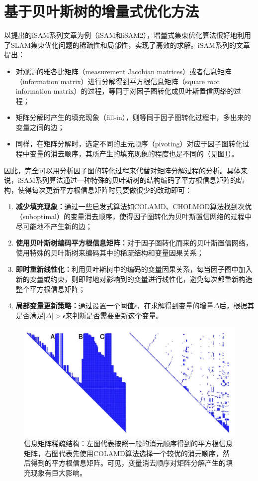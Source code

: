 \section{基于贝叶斯树的增量式优化方法}

以\citeauthor{kaess2008isam}提出的iSAM系列文章为例（iSAM\citep{kaess2008isam}和iSAM2\citep{kaess2012isam2}），增量式集束优化算法很好地利用了SLAM集束优化问题的稀疏性和局部性，实现了高效的求解。iSAM系列的文章提出：
\begin{itemize}
    \item 对观测的雅各比矩阵（measurement Jacobian matrices）或者信息矩阵（information matrix）进行分解得到平方根信息矩阵（square root information matrix）的过程，等同于对因子图转化成贝叶斯置信网络的过程；
    \item 矩阵分解时产生的填充现象（fill-in），则等同于因子图转化过程中，多出来的变量之间的边；
    \item 同样，在矩阵分解时，选定不同的主元顺序（pivoting）对应于因子图转化过程中变量的消去顺序，其所产生的填充现象的程度也是不同的（见图\ref{fig:fill_in}）。
\end{itemize}

因此，完全可以用分析因子图的转化过程来代替对矩阵分解过程的分析。具体来说，iSAM系列算法通过一种特殊的贝叶斯树的结构编码了平方根信息矩阵的结构，使得每次更新平方根信息矩阵时只要做很少的改动即可：
\begin{enumerate}
    \item \textbf{减少填充现象：}通过一些启发式算法如COLAMD\citep{davis2004algorithm}、CHOLMOD\citep{chen2008algorithm}算法找到次优（suboptimal）的变量消去顺序，使得因子图转化为贝叶斯置信网络的过程中尽可能地不产生新的边；
    \item \textbf{使用贝叶斯树编码平方根信息矩阵：}对于因子图转化而来的贝叶斯置信网络，使用特殊的贝叶斯树来编码其中的稀疏结构和变量因果关系；
    \item \textbf{即时重新线性化：}利用贝叶斯树中的编码的变量因果关系，每当因子图中加入新的变量或约束，则即时地对影响到的变量进行线性化，避免每次都重新构造整个平方根信息矩阵；
    \item \textbf{局部变量更新策略：}通过设置一个阈值$\epsilon$，在求解得到变量的增量$\Delta$后，根据其是否满足$|\Delta|>\epsilon$来判断是否需要更新这个变量。
\end{enumerate}

\begin{figure}[htbp]
    \centering
    \includegraphics[width=.8\textwidth]{./figs/sparse_pattern.png}
    \caption{信息矩阵稀疏结构\citep{kaess2008isam}：左图代表按照一般的消元顺序得到的平方根信息矩阵，右图代表先使用COLAMD算法选择一个较优的消元顺序，然后得到的平方根信息矩阵。可见，变量消去顺序对矩阵分解产生的填充现象有巨大影响。}
    \label{fig:fill_in}
\end{figure}
